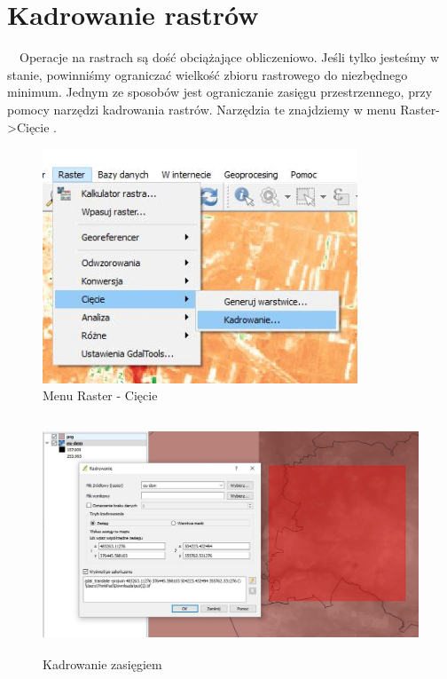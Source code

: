 \documentclass[12pt,a4paper]{book}
\begin{document}
\section{Kadrowanie rastrów}
\ \ Operacje na rastrach są dość obciążające obliczeniowo. Jeśli tylko jesteśmy w stanie, powinniśmy ograniczać wielkość zbioru rastrowego do niezbędnego minimum. Jednym ze sposobów jest ograniczanie zasięgu przestrzennego, przy pomocy narzędzi kadrowania rastrów. Narzędzia te znajdziemy w menu  Raster-{\textgreater}Cięcie .
\begin{figure}[!ht]
	\centering
	\includegraphics[height=7cm]{004-raster-ciecie.png}	
	\caption{Menu Raster - Cięcie}
\end{figure}

\begin{figure}
\includegraphics[height=7cm]{004-raster-kadrowanie.jpg}
\caption{Kadrowanie zasięgiem}
\end{figure}
\end{document}
